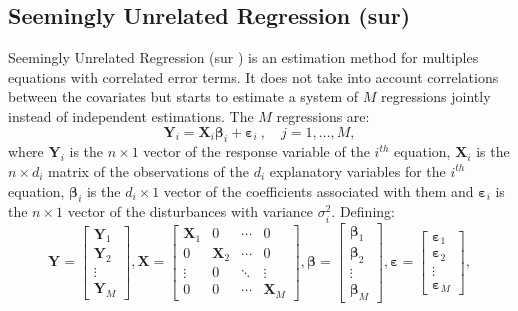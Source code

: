 \documentclass[12pt,a4paper]{report}
\begin{document}
		\subsection{Seemingly Unrelated Regression ({\sc sur})}		%
		Seemingly Unrelated Regression ({\sc sur} \cite{SURzellner}) is an estimation method for multiples equations with correlated error terms. It does not take into account correlations between the covariates but starts to estimate a system of $M$ regressions jointly instead of independent estimations. 
The $M$ regressions are:		
		\begin{equation}
		 \boldsymbol{Y}_i%
		 =\boldsymbol{X}_i\boldsymbol{\beta}_i+\boldsymbol{\varepsilon}_i\ ,\quad j=1,\dots,M,\nonumber
		\end{equation}
		where $\boldsymbol{Y}_i$ is the $n\times 1$ vector of the response variable of the $i^{th}$ equation, $\boldsymbol{X}_i$ is the $n \times d_i$ matrix of the observations of the $d_i$ explanatory variables for the $i^{th}$ equation, $\boldsymbol{\beta}_i$ is the $d_i \times 1$ vector of the coefficients associated with them and $\boldsymbol{\varepsilon}_i$ is the $n\times 1$ vector of the disturbances with variance $\sigma_i^2$.
Defining:
\begin{displaymath}
	\boldsymbol{Y}=\left[\begin{array}{c}
	 \boldsymbol{Y}_1\\ 
	\boldsymbol{Y}_2 \\ 
	\vdots \\ 
	\boldsymbol{Y}_M
	\end{array}  \right],
	\boldsymbol{X}=\left[\begin{array}{cccc}
	 \boldsymbol{X}_1&0 &\cdots &0 \\ 
	0&\boldsymbol{X}_2 &\cdots &0 \\ 
	\vdots & 0 & \ddots &\vdots \\ 
	0 & 0 &\cdots &\boldsymbol{X}_M 
	\end{array}  \right],
	\boldsymbol{\beta}=\left[\begin{array}{c}
	\boldsymbol{\beta}_1 \\ 
	\boldsymbol{\beta}_2 \\ 
	\vdots \\ 
	\boldsymbol{\beta}_M
	\end{array}  \right],
	\boldsymbol{\varepsilon}=\left[\begin{array}{c}
	 \boldsymbol{\varepsilon}_1\\ 
	\boldsymbol{\varepsilon}_2 \\ 
	\vdots \\ 
	\boldsymbol{\varepsilon}_M
	\end{array}  \right],
\end{displaymath}		
\end{document}
